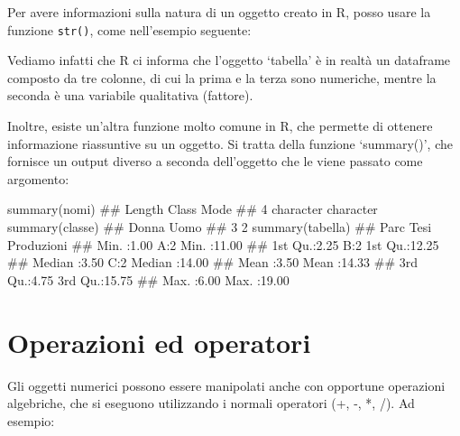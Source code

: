 \documentclass[a4paper,12pt,oneside]{book}
\newenvironment{Shaded}{}{}
\newcommand{\KeywordTok}[1]{#1}
\newcommand{\CommentTok}[1]{#1}
\newcommand{\NormalTok}[1]{#1}
\begin{document}
Per avere informazioni sulla natura di un oggetto creato in R, posso usare la funzione \texttt{str()}, come nell'esempio seguente:

\begin{Shaded}
\end{Shaded}

Vediamo infatti che R ci informa che l'oggetto `tabella' è in realtà un dataframe composto da tre colonne, di cui la prima e la terza sono numeriche, mentre la seconda è una variabile qualitativa (fattore).

Inoltre, esiste un'altra funzione molto comune in R, che permette di ottenere informazione riassuntive su un oggetto. Si tratta della funzione `summary()', che fornisce un output diverso a seconda dell'oggetto che le viene passato come argomento:

\begin{Shaded}
\begin{Highlighting}[]
\KeywordTok{summary}\NormalTok{(nomi)}
\CommentTok{##    Length     Class      Mode }
\CommentTok{##         4 character character}
\KeywordTok{summary}\NormalTok{(classe)}
\CommentTok{## Donna  Uomo }
\CommentTok{##     3     2}
\KeywordTok{summary}\NormalTok{(tabella)}
\CommentTok{##       Parc      Tesi    Produzioni   }
\CommentTok{##  Min.   :1.00   A:2   Min.   :11.00  }
\CommentTok{##  1st Qu.:2.25   B:2   1st Qu.:12.25  }
\CommentTok{##  Median :3.50   C:2   Median :14.00  }
\CommentTok{##  Mean   :3.50         Mean   :14.33  }
\CommentTok{##  3rd Qu.:4.75         3rd Qu.:15.75  }
\CommentTok{##  Max.   :6.00         Max.   :19.00}
\end{Highlighting}
\end{Shaded}

\hypertarget{operazioni-ed-operatori}{%
\section*{Operazioni ed operatori}\label{operazioni-ed-operatori}}

Gli oggetti numerici possono essere manipolati anche con opportune operazioni algebriche, che si eseguono utilizzando i normali operatori (+, -, *, /). Ad esempio:
\end{document}
